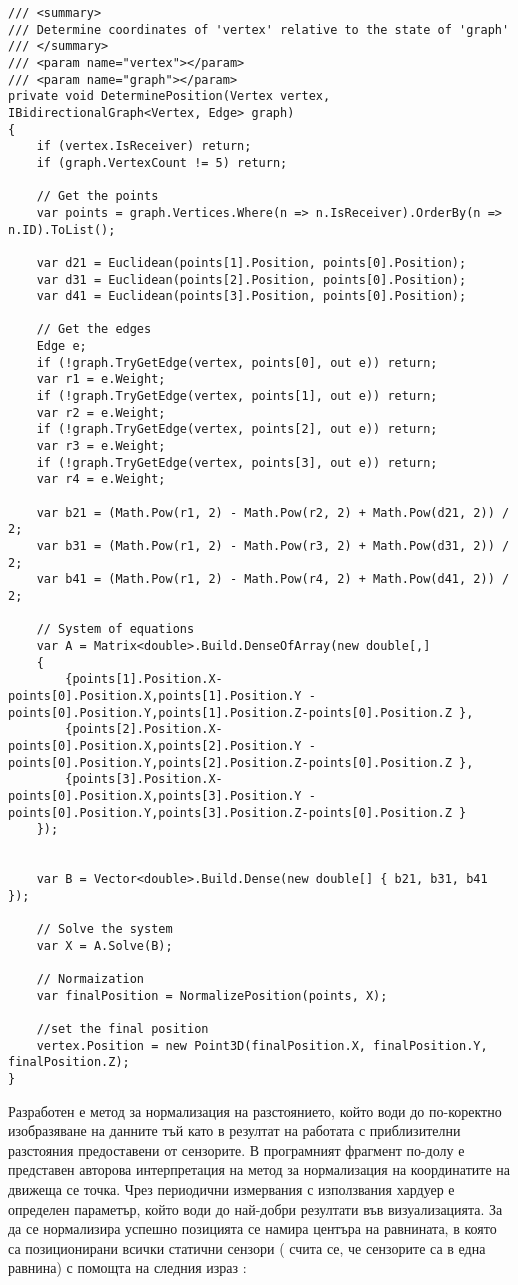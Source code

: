 \begin{lstlisting}
/// <summary>
/// Determine coordinates of 'vertex' relative to the state of 'graph'
/// </summary>
/// <param name="vertex"></param>
/// <param name="graph"></param>
private void DeterminePosition(Vertex vertex, IBidirectionalGraph<Vertex, Edge> graph)
{
    if (vertex.IsReceiver) return;
    if (graph.VertexCount != 5) return;

    // Get the points
    var points = graph.Vertices.Where(n => n.IsReceiver).OrderBy(n => n.ID).ToList();

    var d21 = Euclidean(points[1].Position, points[0].Position);
    var d31 = Euclidean(points[2].Position, points[0].Position);
    var d41 = Euclidean(points[3].Position, points[0].Position);

    // Get the edges
    Edge e;
    if (!graph.TryGetEdge(vertex, points[0], out e)) return;
    var r1 = e.Weight;
    if (!graph.TryGetEdge(vertex, points[1], out e)) return;
    var r2 = e.Weight;
    if (!graph.TryGetEdge(vertex, points[2], out e)) return;
    var r3 = e.Weight;
    if (!graph.TryGetEdge(vertex, points[3], out e)) return;
    var r4 = e.Weight;

    var b21 = (Math.Pow(r1, 2) - Math.Pow(r2, 2) + Math.Pow(d21, 2)) / 2;
    var b31 = (Math.Pow(r1, 2) - Math.Pow(r3, 2) + Math.Pow(d31, 2)) / 2;
    var b41 = (Math.Pow(r1, 2) - Math.Pow(r4, 2) + Math.Pow(d41, 2)) / 2;

    // System of equations
    var A = Matrix<double>.Build.DenseOfArray(new double[,]
    {
        {points[1].Position.X-points[0].Position.X,points[1].Position.Y - points[0].Position.Y,points[1].Position.Z-points[0].Position.Z },
        {points[2].Position.X-points[0].Position.X,points[2].Position.Y - points[0].Position.Y,points[2].Position.Z-points[0].Position.Z },
        {points[3].Position.X-points[0].Position.X,points[3].Position.Y - points[0].Position.Y,points[3].Position.Z-points[0].Position.Z }
    });
    
    
    var B = Vector<double>.Build.Dense(new double[] { b21, b31, b41 });
    
    // Solve the system
    var X = A.Solve(B);

    // Normaization
    var finalPosition = NormalizePosition(points, X);
    
    //set the final position
    vertex.Position = new Point3D(finalPosition.X, finalPosition.Y, finalPosition.Z);
}
\end{lstlisting}

Разработен е метод за нормализация на разстоянието, който води до по-коректно изобразяване на данните тъй като в резултат на работата с приблизителни разстояния предоставени от сензорите. В програмният фрагмент по-долу е представен авторова интерпретация на метод за нормализация на координатите на движеща се точка. Чрез периодични измервания с използвания хардуер е определен параметър, който води до най-добри резултати във визуализацията. За да се нормализира успешно позицията се намира центъра на равнината, в която са позиционирани всички статични сензори ( счита се, че сензорите са в една равнина) с помощта на следния израз :


